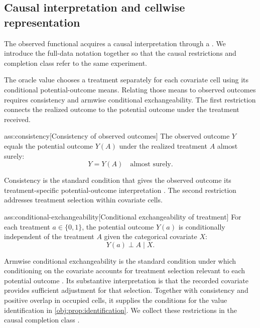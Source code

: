 \subsection{Causal interpretation and cellwise representation}

The observed functional acquires a causal interpretation through a . We introduce the full-data notation together so that the causal restrictions and completion class refer to the same experiment.



The oracle value chooses a treatment separately for each covariate cell using its conditional potential-outcome means. Relating those means to observed outcomes requires consistency and armwise conditional exchangeability. The first restriction connects the realized outcome to the potential outcome under the treatment received.

\begin{assumptionv}{ass:consistency}[Consistency of observed outcomes]
The observed outcome \(Y\) equals the potential outcome \(Y(A)\) under the realized treatment \(A\) almost surely:
\[
Y=Y(A)\quad\text{almost surely}.
\]
\end{assumptionv}

Consistency is the standard condition that gives the observed outcome its treatment-specific potential-outcome interpretation \citep{ZengBalakrishnanHanKennedy2024Discrete}. The second restriction addresses treatment selection within covariate cells.

\begin{assumptionv}{ass:conditional-exchangeability}[Conditional exchangeability of treatment]
For each treatment \(a\in\{0,1\}\), the potential outcome \(Y(a)\) is conditionally independent of the treatment \(A\) given the categorical covariate \(X\):
\[
Y(a)\perp A\mid X.
\]
\end{assumptionv}

Armwise conditional exchangeability is the standard condition under which conditioning on the covariate accounts for treatment selection relevant to each potential outcome \citep{ZengBalakrishnanHanKennedy2024Discrete}. Its substantive interpretation is that the recorded covariate provides sufficient adjustment for that selection. Together with consistency and positive overlap in occupied cells, it supplies the conditions for the value identification in \cref{obj:prop:identification}. We collect these restrictions in the causal completion class .

